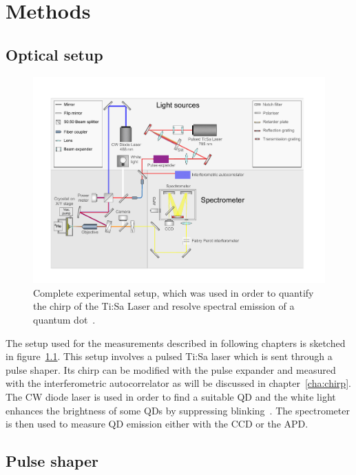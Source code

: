 \chapter{Methods}
\label{cha:methods}

\section{Optical setup}

\begin{figure}[H]
	\centering
	\includegraphics[width=1\linewidth]{figures/setup/Setup_flat}
	\caption[Complete experimental setup]{Complete experimental setup, which was used in order to quantify the chirp of the Ti:Sa Laser and resolve spectral emission of a quantum dot~\cite{schimpf_towards_2017}.}
	\label{fig:setupflat}
\end{figure}


The setup used for the measurements described in following chapters is sketched in figure~\ref{fig:setupflat}.
This setup involves a pulsed Ti:Sa laser which is sent through a pulse shaper.
Its chirp can be modified with the pulse expander and measured with the interferometric autocorrelator as will be discussed in chapter~\ref{cha:chirp}.
The CW diode laser is used in order to find a suitable \ac{QD} and the white light enhances the brightness of some \acp{QD} by suppressing blinking~\cite{jahn_artificial_2015}.
The spectrometer is then used to measure \ac{QD} emission either with the CCD or the APD.  

\section{Pulse shaper}

